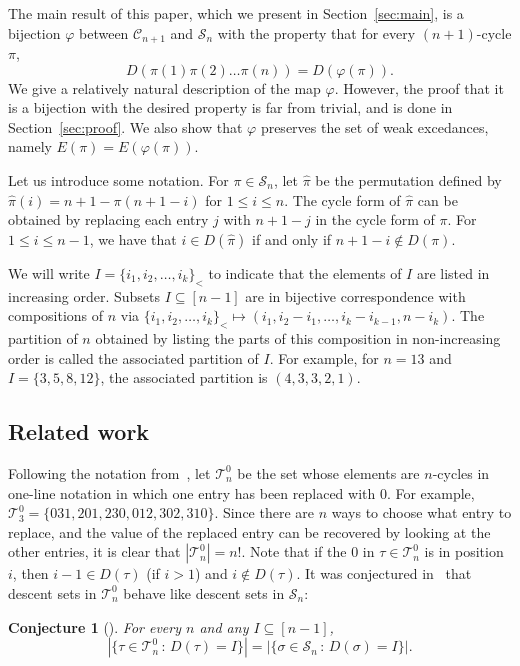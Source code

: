 \documentclass[11pt]{amsart}
\newtheorem{conj}[theorem]{Conjecture}
\renewcommand\S{\mathcal S}
\newcommand\C{\mathcal C}
\newcommand\wh{\widehat}
\newcommand\T{{\mathcal T}}
\newcommand\bij{\varphi}
\begin{document}
The main result of this paper, which we present in Section~\ref{sec:main}, is a bijection $\bij$
between $\C_{n+1}$ and $\S_n$ with the property that for every $(n+1)$-cycle $\pi$,
$$D(\pi(1)\pi(2)\dots\pi(n))=D(\bij(\pi)).$$
We give a relatively natural description of the map $\bij$. However, the proof that it is a bijection with the desired property is far from trivial, and is done in Section~\ref{sec:proof}.
We also show that $\bij$ preserves the set of weak excedances, namely $E(\pi)=E(\bij(\pi))$.

Let us introduce some notation. For $\pi\in\S_n$, let $\wh\pi$ be the permutation defined by $\wh\pi(i)=n+1-\pi(n+1-i)$ for $1\le i\le n$.
The cycle form of $\wh\pi$ can be obtained by replacing each entry $j$ with $n+1-j$ in the cycle form of $\pi$.
For $1\le i\le n-1$, we have that $i\in D(\wh\pi)$ if and only if $n+1-i\notin D(\pi)$.

We will write $I=\{i_1,i_2,\dots,i_k\}_<$ to indicate that the elements of $I$ are listed in increasing order.
Subsets $I\subseteq[n-1]$ are in bijective correspondence with compositions of $n$ via $\{i_1,i_2,\dots,i_k\}_<\mapsto (i_1,i_2-i_1,\dots,i_k-i_{k-1},n-i_k)$. The partition of $n$ obtained by listing the parts of this composition
in non-increasing order is called the associated partition of $I$. For example, for $n=13$ and $I=\{3,5,8,12\}$, the associated partition is $(4,3,3,2,1)$.


\subsection{Related work}

Following the notation from~\cite{Eli}, let $\T^0_n$ be the set whose elements are $n$-cycles in one-line notation in which one entry has been replaced with $0$.
For example, $\T^0_3=\{031,201,230,012,302,310\}$. Since there are $n$ ways to choose what entry to replace, and the value of the replaced entry can be recovered by looking at the other entries,
it is clear that $|\T^0_n|=n!$. Note that if the $0$ in $\tau\in\T^0_n$ is in position $i$, then $i-1\in D(\tau)$ (if $i>1$) and $i\notin D(\tau)$.
It was conjectured in~\cite{Eli} that descent sets in $\T^0_n$ behave like descent sets in $\S_n$:

\begin{conj}[\cite{Eli}]\label{conj:Eli} For every $n$ and any $I\subseteq[n-1]$,
$$|\{\tau\in\T^0_n\,:\,D(\tau)=I\}|=|\{\sigma\in\S_n\,:\,D(\sigma)=I\}|.$$
\end{conj}
\end{document}
